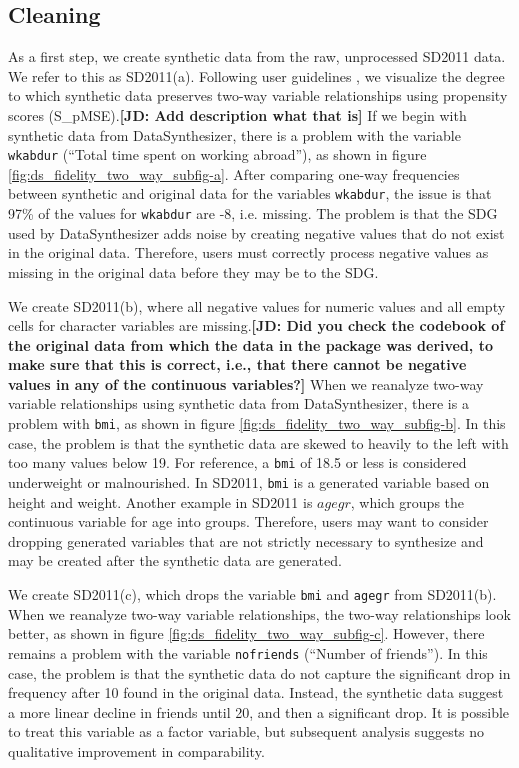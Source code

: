 \documentclass[runningheads]{llncs}
\newcommand{\jd}[1]{\scriptsize {\bf \color{red}[JD: #1]}\normalsize}
\begin{document}
\subsection{Cleaning}

As a first step, we create synthetic data from the raw, unprocessed SD2011 data.  We refer to this as SD2011(a).  Following user guidelines \cite{raab2021assessing}, we visualize the degree to which synthetic data preserves two-way variable relationships using propensity scores (S\_pMSE).\jd{Add description what that is}  If we begin with synthetic data from DataSynthesizer, there is a problem with the variable \texttt{wkabdur} (``Total time spent on working abroad''), as shown in figure \ref{fig:ds_fidelity_two_way_subfig-a}.  After comparing one-way frequencies between synthetic and original data for the variables \texttt{wkabdur}, the issue is that 97\% of the values for \texttt{wkabdur} are -8, i.e. missing.  The problem is that the SDG used by DataSynthesizer adds noise by creating negative values that do not exist in the original data.  Therefore, users must correctly process negative values as missing in the original data before they may be to the SDG.  

We create SD2011(b), where all negative values for numeric values and all empty cells for character variables are missing.\jd{Did you check the codebook of the original data from which the data in the package was derived, to make sure that this is correct, i.e., that there cannot be negative values in any of the continuous variables?}  When we reanalyze two-way variable relationships using synthetic data from DataSynthesizer, there is a problem with \texttt{bmi}, as shown in figure \ref{fig:ds_fidelity_two_way_subfig-b}.  In this case, the problem is that the synthetic data are skewed to heavily to the left with too many values below 19.  For reference, a \texttt{bmi} of 18.5 or less is considered underweight or malnourished.  In SD2011, \texttt{bmi} is a generated variable based on height and weight.  Another example in SD2011 is $agegr$, which groups the continuous variable for age into groups.  Therefore, users may want to consider dropping generated variables that are not strictly necessary to synthesize and may be created after the synthetic data are generated.  

We create SD2011(c), which drops the variable \texttt{bmi} and \texttt{agegr}  from SD2011(b).  When we reanalyze two-way variable relationships, the two-way relationships look better, as shown in figure \ref{fig:ds_fidelity_two_way_subfig-c}.  However, there remains a problem with the variable \texttt{nofriends} (``Number of friends'').  In this case, the problem is that the synthetic data do not capture the significant drop in frequency after 10 found in the original data.  Instead, the synthetic data suggest a more linear decline in friends until 20, and then a significant drop.  It is possible to treat this variable as a factor variable, but subsequent analysis suggests no qualitative improvement in comparability.
\end{document}
